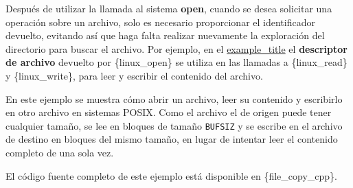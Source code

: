 Después de utilizar la llamada al sistema \textbf{open}, cuando se desea
solicitar una operación sobre un archivo, solo es necesario proporcionar
el identificador devuelto, evitando así que haga falta realizar
nuevamente la exploración del directorio para buscar el archivo. Por
ejemplo, en el \hyperref[ejemplo-archivos]{example\_title} el
\textbf{descriptor de archivo} devuelto por \{linux\_open\} se utiliza
en las llamadas a \{linux\_read\} y \{linux\_write\}, para leer y
escribir el contenido del archivo.

En este ejemplo se muestra cómo abrir un archivo, leer su contenido y
escribirlo en otro archivo en sistemas POSIX. Como el archivo el de
origen puede tener cualquier tamaño, se lee en bloques de tamaño
\texttt{BUFSIZ} y se escribe en el archivo de destino en bloques del
mismo tamaño, en lugar de intentar leer el contenido completo de una
sola vez.

El código fuente completo de este ejemplo está disponible en
\{file\_copy\_cpp\}.

